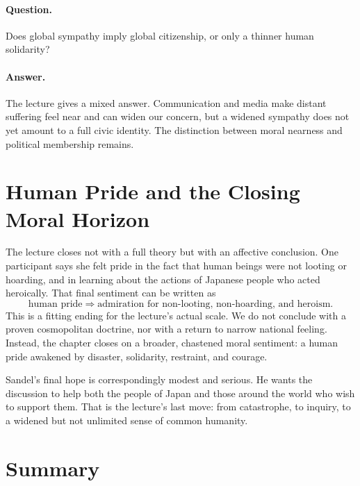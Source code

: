 \paragraph{Question.} Does global sympathy imply global citizenship, or only a thinner human solidarity?

\paragraph{Answer.} The lecture gives a mixed answer. Communication and media make distant suffering feel near and can widen our concern, but a widened sympathy does not yet amount to a full civic identity. The distinction between moral nearness and political membership remains.

\section{Human Pride and the Closing Moral Horizon}

The lecture closes not with a full theory but with an affective conclusion. One participant says she felt pride in the fact that human beings were not looting or hoarding, and in learning about the actions of Japanese people who acted heroically. That final sentiment can be written as
\begin{equation}
\text{human pride}
\Longrightarrow
\text{admiration for non-looting, non-hoarding, and heroism}.
\end{equation}
This is a fitting ending for the lecture's actual scale. We do not conclude with a proven cosmopolitan doctrine, nor with a return to narrow national feeling. Instead, the chapter closes on a broader, chastened moral sentiment: a human pride awakened by disaster, solidarity, restraint, and courage.

Sandel's final hope is correspondingly modest and serious. He wants the discussion to help both the people of Japan and those around the world who wish to support them. That is the lecture's last move: from catastrophe, to inquiry, to a widened but not unlimited sense of common humanity.

\section{Summary}


